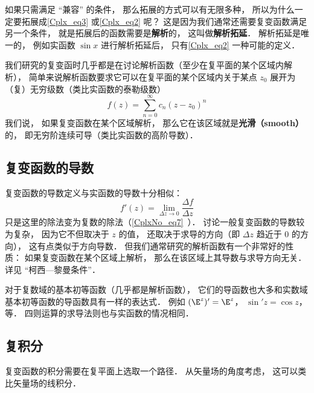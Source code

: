 如果只需满足 “兼容” 的条件， 那么拓展的方式可以有无限多种， 所以为什么一定要拓展成\autoref{Cplx_eq3} 或\autoref{Cplx_eq2} 呢？ 这是因为我们通常还需要复变函数满足另一个条件， 就是拓展后的函数需要是\textbf{解析}的， 这叫做\textbf{解析拓延}． %
解析拓延是唯一的， 例如实函数 $\sin x$ 进行解析拓延后， 只有\autoref{Cplx_eq2} 一种可能的定义．

我们研究的复变函时几乎都是在讨论解析函数（至少在复平面的某个区域内解析）， 简单来说解析函数要求它可以在复平面的某个区域内关于某点 $z_0$ 展开为（复）无穷级数（类比实函数的泰勒级数）
\begin{equation}
f(z) = \sum_{n=0}^\infty c_n (z - z_0)^n
\end{equation}
我们说， 如果复变函数在某个区域解析， 那么它在该区域就是\textbf{光滑（smooth）}的， 即无穷阶连续可导（类比实函数的高阶导数）．

\subsection{复变函数的导数}
复变函数的导数定义与实函数的导数十分相似：
\begin{equation}
f'(z) = \lim_{\Delta z \to 0} \frac{\Delta f}{\Delta z}
\end{equation}
只是这里的除法变为复数的除法（\autoref{CplxNo_eq7}~）． 讨论一般复变函数的导数较为复杂， 因为它不但取决于 $z$ 的值， 还取决于求导的方向（即 $\Delta z$ 趋近于 $0$ 的方向）， 这有点类似于方向导数． 但我们通常研究的解析函数有一个非常好的性质： 如果复变函数在某个区域上解析， 那么在该区域上其导数与求导方向无关． 详见 “柯西—黎曼条件”．

对于复数域的基本初等函数（几乎都是解析函数）， 它们的导函数也大多和实数域基本初等函数的导函数具有一样的表达式． 例如 $(\E^z)' = \E^z$， $\sin' z = \cos z$， 等． 四则运算的求导法则也与实函数的情况相同．

\subsection{复积分}
复变函数的积分需要在复平面上选取一个路径． 从矢量场的角度考虑， 这可以类比矢量场的线积分．
